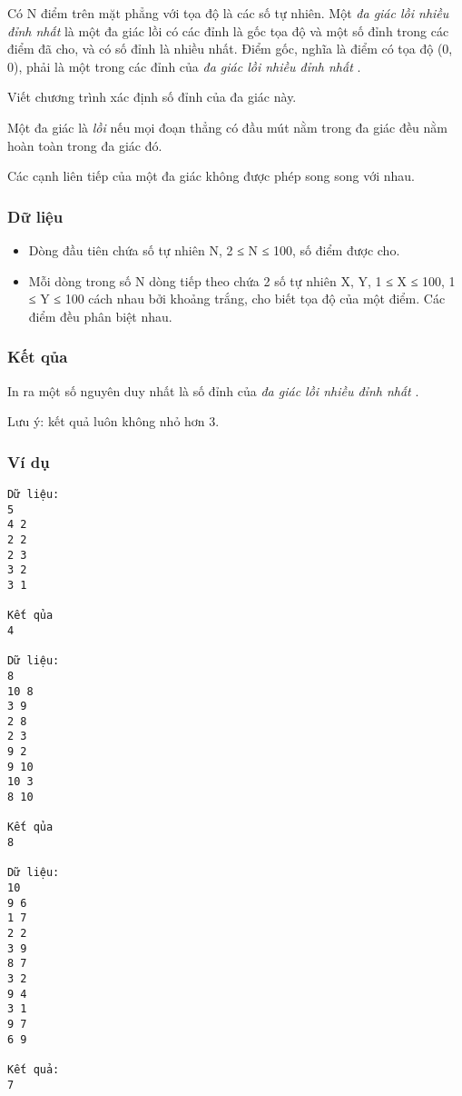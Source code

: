 



   Có N điểm trên mặt phẳng với tọa độ là các số tự nhiên. Một   \textit{    đa giác lồi nhiều đỉnh nhất   }   là một đa giác lồi có các đỉnh là       gốc tọa độ      và một số đỉnh trong các điểm đã cho, và có số đỉnh là nhiều nhất. Điểm gốc, nghĩa là điểm có tọa độ (0, 0),       phải      là một trong các đỉnh của   \textit{    đa giác lồi nhiều đỉnh nhất   }   .  

   Viết chương trình xác định số đỉnh của đa giác này.  

   Một đa giác là   \textit{    lồi   }   nếu mọi đoạn thẳng có đầu mút nằm trong đa giác đều nằm hoàn toàn trong đa giác đó.  

   Các cạnh liên tiếp của một đa giác không được phép song song với nhau.  

\subsubsection{   Dữ liệu  }
\begin{itemize}
	\item     Dòng đầu tiên chứa số tự nhiên N, 2 ≤ N ≤ 100, số điểm được cho.   
	\item     Mỗi dòng trong số N dòng tiếp theo chứa 2 số tự nhiên X, Y, 1 ≤ X ≤ 100, 1 ≤ Y ≤ 100 cách nhau bởi khoảng trắng, cho biết tọa độ của một điểm. Các điểm đều phân biệt nhau.   
\end{itemize}

\subsubsection{   Kết qủa  }

   In ra một số nguyên duy nhất là số đỉnh của   \textit{    đa giác lồi nhiều đỉnh nhất   }   .  

   Lưu ý: kết quả luôn không nhỏ hơn 3.  

\subsubsection{   Ví dụ  }
\begin{verbatim}
Dữ liệu:
5
4 2
2 2
2 3
3 2
3 1

Kết qủa
4

Dữ liệu:
8
10 8
3 9
2 8
2 3
9 2
9 10
10 3
8 10

Kết qủa
8

Dữ liệu:
10
9 6
1 7
2 2
3 9
8 7
3 2
9 4
3 1
9 7
6 9

Kết quả:
7
\end{verbatim}